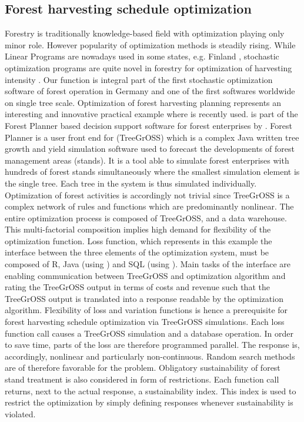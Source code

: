\subsection{Forest harvesting schedule optimization}
Forestry is traditionally knowledge-based field with optimization playing only minor role. However popularity of optimization methods is steadily rising. While Linear Programs are nowadays used in some states, e.g. Finland \citep{redsven_2012}, stochastic optimization programs are quite novel in forestry for optimization of harvesting intensity \citep{kangas_2015}. Our function is integral part of the first stochastic optimization software of forest operation in Germany and one of the first softwares worldwide on single tree scale. Optimization of forest harvesting planning represents an interesting and innovative practical example where  is recently used.  is part of the Forest Planner based decision support software for forest enterprises by \citet{hansen_2014}. Forest Planner is a user front end for  (TreeGrOSS) which is a complex Java written tree growth and yield simulation software used to forecast the developments of forest management areas (stands). It is a tool able to simulate forest enterprises with hundreds of forest stands simultaneously where the smallest simulation element is the single tree. Each tree in the system is thus simulated individually. Optimization of forest activities is accordingly not trivial since TreeGrOSS is a complex network of rules and functions which are predominantly nonlinear. The entire optimization process is composed of TreeGrOSS,  and a data warehouse. This multi-factorial composition implies high demand for flexibility of the optimization function. Loss function, which represents in this example the interface between the three elements of the optimization system, must be composed of R, Java (using ) and SQL (using ). Main tasks of the interface are enabling communication between TreeGrOSS and optimization algorithm and rating the TreeGrOSS output in terms of costs and revenue such that the TreeGrOSS output is translated into a response readable by the optimization algorithm. Flexibility of loss and variation functions is hence a prerequisite for forest harvesting schedule optimization via TreeGrOSS simulations. Each loss function call causes a TreeGrOSS simulation and a database operation. In order to save time, parts of the loss are therefore programmed parallel. The response is, accordingly, nonlinear and particularly non-continuous. Random search methods are of therefore favorable for the problem. Obligatory sustainability of forest stand treatment is also considered in form of restrictions. Each function call returns, next to the actual response, a sustainability index. This index is used to restrict the optimization by simply defining  responses whenever sustainability is violated.

